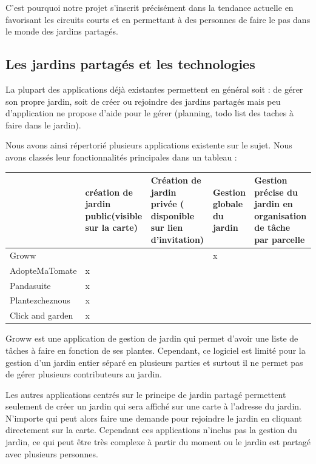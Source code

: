 \documentclass[french,a4paper]{article}
\begin{document}
C’est pourquoi notre projet s’inscrit précisément dans la tendance actuelle en favorisant les circuits courts et en permettant à des personnes de faire le pas dans le monde des jardins partagés.
\subsection{Les jardins partagés et les technologies}
La plupart des applications déjà existantes permettent en général soit : de gérer son propre jardin, soit de créer ou rejoindre des jardins partagés mais peu d’application ne propose d’aide pour le gérer (planning, todo list des taches à faire dans le jardin).

Nous avons ainsi répertorié plusieurs applications existente sur le sujet. Nous avons classés leur fonctionnalités principales dans un tableau :

\begin{center}
    \begin{tabular}{ |l| p{3cm} | p{3cm} | p{3cm} | p{3cm} | } 
        \hline
         & \raggedright création de jardin public(visible sur la carte) & \raggedright Création de jardin privée ( disponible sur lien d’invitation) & \raggedright Gestion globale du jardin & Gestion précise du jardin en organisation de tâche par parcelle \\
        \hline
        Groww &  &  & x & \\
        \hline
        AdopteMaTomate & x &  &  & \\
        \hline
        Pandasuite & x & & & \\
        \hline
        Plantezcheznous & x & & & \\
        \hline
        Click and garden & x & & & \\

        \hline
        \end{tabular}
\end{center}

Groww est une application de gestion de jardin qui permet d’avoir une liste de tâches à faire en fonction de ses plantes. Cependant, ce logiciel est limité pour la gestion d’un jardin entier séparé en plusieurs parties et surtout il ne permet pas de gérer plusieurs contributeurs au jardin.

Les autres applications centrés sur le principe de jardin partagé permettent seulement de créer un jardin qui sera affiché sur une carte à l’adresse du jardin. N’importe qui peut alors faire une demande pour rejoindre le jardin en cliquant directement sur la carte. Cependant ces applications n’inclus pas la gestion du jardin, ce qui peut être très complexe à partir du moment ou le jardin est partagé avec plusieurs personnes.
\end{document}
